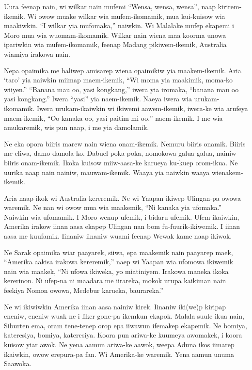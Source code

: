 Uura  feenap  nain,  wi  wilkar  nain  mufemi “Wensa,  wensa,  wensa”,  naap  kirirem-ikemik.
Wi  owow  muake  wilkar  wia mufem-ikomamik,  mua  kui-kuisow wia  maakiwkin.
“I  wilkar  yia  mufomaka,”  naiwkin. 
Wi  Malalake  mufep  ekapemi  i  Moro mua  wia  wuomam-ikomamik.
Wilkar  nain  wiena  maa  koorma  unowa  ipariwkin wia  mufem-ikomamik, feenap  Madang  pikiwem-ikemik, Australia  wiamiya  irakowa  nain. 

Nepa  opaimika  me  baliwep  amisarep wiena  opaimikiw  yia  maakem-ikemik. 
Aria  ‘taro’  yia  naiwkin  miimap maem-ikemik,  “Wi  moma  yia  maakimik,  moma-ko  wiiyen.” 
“Banana  mau  oo,  yasi  kongkang,” iwera yia iromaka, “banana  mau  oo  yasi  kongkang.” 
Iwera  “yasi”  yia  naem-ikemik. 
Naeya  iwera  wia  urukam-ikomamik. 
Iwera  urukam-ikaiwkin  wi  ikiwemi  aawem-ikemik,  iwera-ke  wia  arufeya   maem-ikemik,  “Oo  kanaka  oo,  yasi  paitim  mi  oo,” naem-ikemik. 
I  me  wia  amukaremik,  wis  pun  naap, i  me  yia  damolamik. 

Ne  eka  opora  biiris  marew  nain  wiena  onam-ikemik. 
Nemuru  biiris  onamik. 
Biiris  me  eliwa,  damo-damola-ko. 
Dabuel  poka-poka,  nomokowa  galua-galua,  nainiw  biiris  onam-ikemik. 
Ikoka  kuisow  miiw-aasa-ke  karueya  ku-kuep   orom-ikua. 
Ne  uurika  naap  nain  nainiw,  mauwam-ikemik. 
Waaya  yia  naiwkin  waaya  wienakem-ikemik. 

Aria  naap  ikok  wi  Australia  kereremik. 
Ne  wi  Yaapan  ikiwep  Ulingan-pa  owowa waremik. 
Ne  nan  wi  owow  mua  wia  maakemik, “Ni  kanaka  yia  ufomaka.” 
Naiwkin  wia  ufomamik. 
I  Moro  wenup  ufemik, i  bidaru  ufemik. 
Ufem-ikaiwkin,  Amerika  irakow  iinan  aasa  ekapep  Ulingan  nan  bom  fu-fuurik-ikiwemik. 
I  iinan  aasa  me  kuufamik. 
Iinaniw  iinaniw  wuami  feenap  Wewak  kame naap ikiwok.

Ne  Sarak  opaimika  wiar  paayarek,  siiwa,  epa  maakemik  nain  paayarep  maek, “Amerika  aakisa  irakowa  kereremik,”  naep  wi  Yaapan  wia  ufomowa  ikiwemik  nain  wia  maakek, “Ni  ufowa  ikiweka,  yo  miatiniyem. 
Irakowa  maneka  ikoka  kererinon. 
Ni  ufep-na  ni  maadara  me iirareka,  mokok  urupa  kaikiman  nain  feekiya Nomon  owowa,  Medebur  karueka,  baurareka.” 

Ne  wi  ikiwiwkin  Amerika  iinan  aasa  nainiw  kirek. 
Iinaniw  iki(we)p  kiripap  eneniw, eneniw  wuak  ne  i  fiker  gone-pa  ikemkun  ekapok. 
Malala  suule  ikua  nain,  Siburten  ema,  oram  tene-tenep  orop  epa  iiwawun  ifemakep  ekapemik. 
Ne  bomiya,  kateresiya,  bomiya,  kateresiya. 
Koora  pun  ariwa-ke  kuumeya  awomakek,  i  koora  kuisow  yiar  awok. 
Ne  yena  aamun  ariwa-ke  aawok, weepa  Aduna  ikos  iimarep  ikaiwkin,  owow  erepura-pa  fan. 
Wi  Amerika-ke  waremik. 
Yena  aamun  unuma  Saawoka. 

